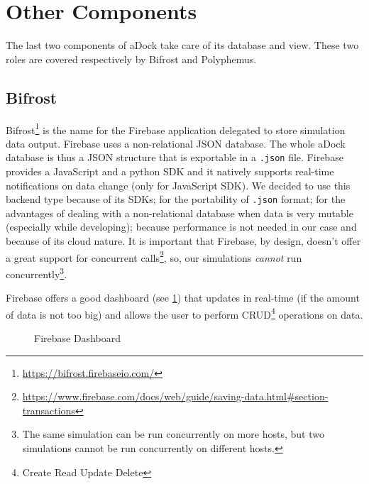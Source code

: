 \section{Other Components}
\label{sec:others}
The last two components of aDock take care of its database and view. These two roles are covered respectively by Bifrost and Polyphemus.

\subsection{Bifrost}
\label{sub:bifrost}
Bifrost\footnote{\url{https://bifrost.firebaseio.com/}} is the name for the Firebase application delegated to store simulation data output. Firebase uses a non-relational JSON database. The whole aDock database is thus a JSON structure that is exportable in a \texttt{.json} file. Firebase provides a JavaScript and a python SDK and it natively supports real-time notifications on data change (only for JavaScript SDK). We decided to use this backend type because of its SDKs; for the portability of \texttt{.json} format; for the advantages of dealing with a non-relational database when data is very mutable (especially while developing); because performance is not needed in our case and because of its cloud nature. It is important that Firebase, by design, doesn't offer a great support for concurrent calls\footnote{\url{https://www.firebase.com/docs/web/guide/saving-data.html\#section-transactions}}, so, our simulations \textit{cannot} run concurrently\footnote{The same simulation can be run concurrently on more hosts, but two simulations cannot be run concurrently on different hosts.}.

Firebase offers a good dashboard (see \ref{fig:firebase_dash}) that updates in real-time (if the amount of data is not too big) and allows the user to perform CRUD\footnote{Create Read Update Delete} operations on data. 

\begin{figure}[H]
\label{fig:firebase_dash}
\caption{Firebase Dashboard}
\end{figure}

